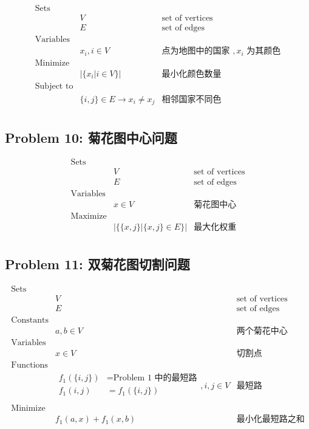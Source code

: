 \documentclass[11pt]{article}
\begin{document}
\begin{eqnarray*}
    \textrm{Sets} \\
        & V & \textrm{set of vertices} \\
        & E & \textrm{set of edges} \\
    \textrm{Variables} \\
        & x_i, i \in V & \textrm{点为地图中的国家 $,x_i$ 为其颜色} \\
    \textrm{Minimize} \\
        & |\{x_i | i \in V\}| & \textrm{最小化颜色数量} \\
    \textrm{Subject to} \\
        & \{i, j\} \in E \to x_i \neq x_j & \textrm{相邻国家不同色} \\
\end{eqnarray*}

\newpage
\subsection*{Problem 10: 菊花图中心问题}

\begin{eqnarray*}
    \textrm{Sets} \\
        & V & \textrm{set of vertices} \\
        & E & \textrm{set of edges} \\
    \textrm{Variables} \\
        & x \in V & \textrm{菊花图中心} \\
    \textrm{Maximize} \\
        & |\{\{x, j\} | \{x, j\} \in E\}| & \textrm{最大化权重} \\
\end{eqnarray*}

\newpage
\subsection*{Problem 11: 双菊花图切割问题}

\begin{eqnarray*}
    \textrm{Sets} \\
        & V & \textrm{set of vertices} \\
        & E & \textrm{set of edges} \\
    \textrm{Constants} \\
        & a, b \in V & \textrm{两个菊花中心} \\
    \textrm{Variables} \\
        & x \in V & \textrm{切割点} \\
    \textrm{Functions} \\
        & \begin{array}{rl}
            f_1(\{i, j\}) &= \textrm{Problem 1 中的最短路} \\
            f_1(i, j) &= f_1(\{i, j\}) \\
        \end{array}, i, j \in V & \textrm{最短路} \\
    \textrm{Minimize} \\
        & f_1(a, x) + f_1(x, b) & \textrm{最小化最短路之和} \\
\end{eqnarray*}
\end{document}
